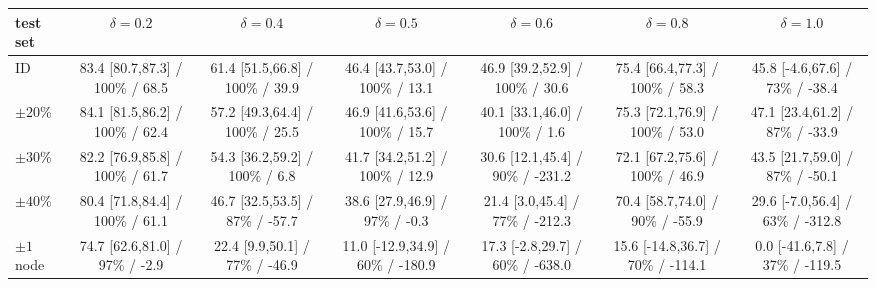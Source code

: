 
\begin{tabular}{lcccccc}
\toprule
test set & $\delta=0.2$ & $\delta=0.4$ & $\delta=0.5$ & $\delta=0.6$ & $\delta=0.8$ & $\delta=1.0$ \\
\midrule
ID & 83.4 [80.7,87.3] / 100\% / 68.5 & 61.4 [51.5,66.8] / 100\% / 39.9 & 46.4 [43.7,53.0] / 100\% / 13.1 & 46.9 [39.2,52.9] / 100\% / 30.6 & 75.4 [66.4,77.3] / 100\% / 58.3 & 45.8 [-4.6,67.6] / 73\% / -38.4 \\
$\pm20\%$ & 84.1 [81.5,86.2] / 100\% / 62.4 & 57.2 [49.3,64.4] / 100\% / 25.5 & 46.9 [41.6,53.6] / 100\% / 15.7 & 40.1 [33.1,46.0] / 100\% / 1.6 & 75.3 [72.1,76.9] / 100\% / 53.0 & 47.1 [23.4,61.2] / 87\% / -33.9 \\
$\pm30\%$ & 82.2 [76.9,85.8] / 100\% / 61.7 & 54.3 [36.2,59.2] / 100\% / 6.8 & 41.7 [34.2,51.2] / 100\% / 12.9 & 30.6 [12.1,45.4] / 90\% / -231.2 & 72.1 [67.2,75.6] / 100\% / 46.9 & 43.5 [21.7,59.0] / 87\% / -50.1 \\
$\pm40\%$ & 80.4 [71.8,84.4] / 100\% / 61.1 & 46.7 [32.5,53.5] / 87\% / -57.7 & 38.6 [27.9,46.9] / 97\% / -0.3 & 21.4 [3.0,45.4] / 77\% / -212.3 & 70.4 [58.7,74.0] / 90\% / -55.9 & 29.6 [-7.0,56.4] / 63\% / -312.8 \\
$\pm1$ node & 74.7 [62.6,81.0] / 97\% / -2.9 & 22.4 [9.9,50.1] / 77\% / -46.9 & 11.0 [-12.9,34.9] / 60\% / -180.9 & 17.3 [-2.8,29.7] / 60\% / -638.0 & 15.6 [-14.8,36.7] / 70\% / -114.1 & 0.0 [-41.6,7.8] / 37\% / -119.5 \\
\bottomrule
\end{tabular}
